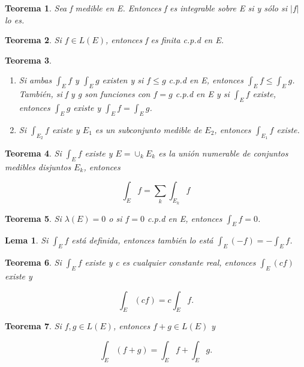 \documentclass{article}
\newtheorem{theorem}{Teorema}
\newtheorem{lemma}{Lema}
\begin{document}
\begin{theorem}
Sea f medible en E. Entonces f es integrable sobre E si y sólo si $|f|$ lo es.
\end{theorem}

\begin{theorem}
Si $f \in L(E)$, entonces f es finita c.p.d en E.
\end{theorem}

\begin{theorem}
\begin{enumerate}[label=(\roman*)]
\item Si ambas $\int_E f$ y $\int_E g$ existen y si $f \leq g$ c.p.d en E, entonces $\int_E f \leq \int_E g$. También, si f y g son funciones con $f = g$ c.p.d en E y si $\int_E f$ existe, entonces $\int_E g$ existe y $\int_E f = \int_E g$.

\item Si $\int_{E_2} f$ existe y $E_1$ es un subconjunto medible de $E_2$, entonces $\int_{E_1} f$ existe.
\end{enumerate}
\end{theorem}

\begin{theorem}
Si $\int_E f$ existe y $E = \cup_k E_k$ es la unión numerable de conjuntos medibles disjuntos $E_k$, entonces

\begin{equation*}
\int_E f = \sum_k \int_{E_k} f
\end{equation*}
\end{theorem}

\begin{theorem}
Si $\lambda(E)=0$ o si $f = 0$ c.p.d en E, entonces $\int_E f = 0$.
\end{theorem}

\begin{lemma}
Si $\int_E f$ está definida, entonces también lo está $\int_E (-f) = -\int_E f$.
\end{lemma}

\begin{theorem}
Si $\int_E f$ existe y c es cualquier constante real, entonces $\int_E (cf)$ existe y 

\begin{equation*}
\int_E (cf) = c\int_E f.
\end{equation*}
\end{theorem}

\begin{theorem}
Si $f,g \in L(E)$, entonces $f+g \in L(E)$ y

\begin{equation*}
\int_E(f+g) = \int_E f + \int_E g.
\end{equation*}

\end{theorem}
\end{document}
